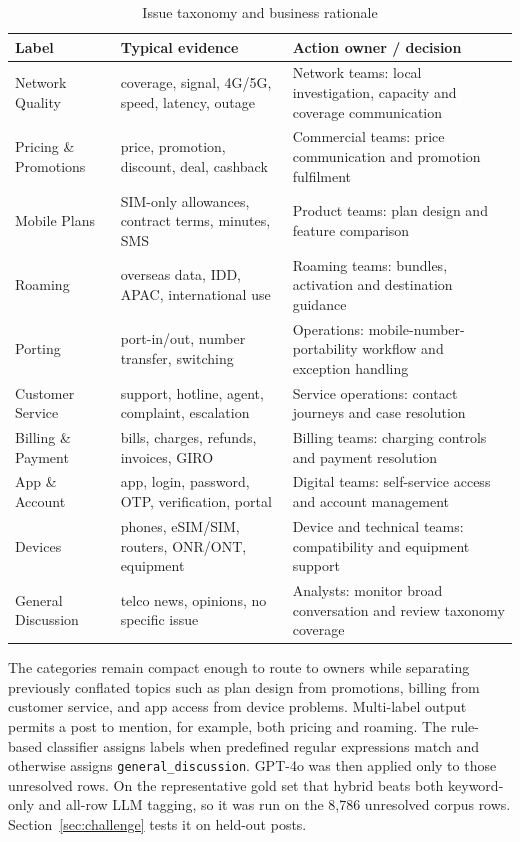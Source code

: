 \documentclass[11pt,a4paper]{article}
\begin{document}
\begin{table}[H]
\centering
\caption{Issue taxonomy and business rationale}
\label{tab:taxonomy}
\begin{tabularx}{\textwidth}{@{}p{}p{}X@{}}
\toprule
\textbf{Label} & \textbf{Typical evidence} & \textbf{Action owner / decision} \\
\midrule
Network Quality & coverage, signal, 4G/5G, speed, latency, outage & Network teams: local investigation, capacity and coverage communication \\
Pricing \& Promotions & price, promotion, discount, deal, cashback & Commercial teams: price communication and promotion fulfilment \\
Mobile Plans & SIM-only allowances, contract terms, minutes, SMS & Product teams: plan design and feature comparison \\
Roaming & overseas data, IDD, APAC, international use & Roaming teams: bundles, activation and destination guidance \\
Porting & port-in/out, number transfer, switching & Operations: mobile-number-portability workflow and exception handling \\
Customer Service & support, hotline, agent, complaint, escalation & Service operations: contact journeys and case resolution \\
Billing \& Payment & bills, charges, refunds, invoices, GIRO & Billing teams: charging controls and payment resolution \\
App \& Account & app, login, password, OTP, verification, portal & Digital teams: self-service access and account management \\
Devices & phones, eSIM/SIM, routers, ONR/ONT, equipment & Device and technical teams: compatibility and equipment support \\
General Discussion & telco news, opinions, no specific issue & Analysts: monitor broad conversation and review taxonomy coverage \\
\bottomrule
\end{tabularx}
\end{table}

The categories remain compact enough to route to owners while separating previously conflated topics such as plan design from promotions, billing from customer service, and app access from device problems. Multi-label output permits a post to mention, for example, both pricing and roaming. The rule-based classifier assigns labels when predefined regular expressions match and otherwise assigns \texttt{general\_discussion}. GPT-4o was then applied only to those unresolved rows. On the representative gold set that hybrid beats both keyword-only and all-row LLM tagging, so it was run on the 8,786 unresolved corpus rows. Section~\ref{sec:challenge} tests it on held-out posts.
\end{document}
